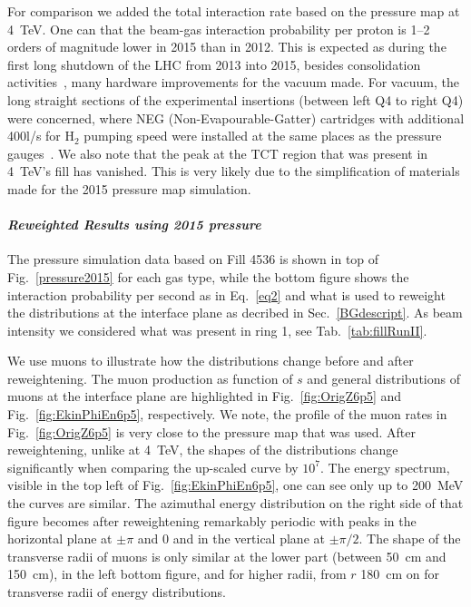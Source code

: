 For comparison we added the total interaction rate based on the pressure map at 4~TeV. One can that the beam-gas interaction probability per proton is 1--2 orders of magnitude lower in 2015 than in 2012. This is expected as during the first long shutdown of the LHC from 2013 into 2015, besides consolidation activities~\cite{KatyForazIpac14}, many hardware improvements for the vacuum made. For vacuum, the long straight sections of the experimental insertions (between left Q4 to right Q4) were concerned, where NEG (Non-Evapourable-Gatter) cartridges with additional 400l/s for H$_2$ pumping speed were installed at the same places as the pressure gauges~\cite{christinaPriv}. We also note that the peak at the TCT region that was present in 4~TeV's fill has vanished. This is very likely due to the simplification of materials made for the 2015 pressure map simulation.


\paragraph{\textit{Reweighted Results using 2015 pressure}}

The pressure simulation data based on Fill 4536 is shown in top of Fig.~\ref{pressure2015} for each gas type, while the bottom figure shows the interaction probability per second as in Eq.~\ref{eq2} and what is used to reweight the distributions at the interface plane as decribed in Sec.~\ref{BGdescript}. As beam intensity we considered what was present in ring 1, see Tab.~\ref{tab:fillRunII}.

We use muons to illustrate how the distributions change before and after reweightening. The muon production as function of $s$ and general distributions of muons at the interface plane are highlighted in Fig.~\ref{fig:OrigZ6p5} and Fig.~\ref{fig:EkinPhiEn6p5}, respectively. We note, the profile of the muon rates in Fig.~\ref{fig:OrigZ6p5} is very close to the pressure map that was used. After reweightening, unlike at 4~TeV, the shapes of the distributions change significantly when comparing the up-scaled curve by $10^7$. The energy spectrum, visible in the top left of Fig.~\ref{fig:EkinPhiEn6p5}, one can see only up to 200~MeV the curves are similar. The azimuthal energy distribution on the right side of that figure becomes after reweightening remarkably periodic with peaks in the horizontal plane at $\pm \pi$ and $0$ and in the vertical plane at $\pm \pi/2$. The shape of the transverse radii of muons is only similar at the lower part (between 50~cm and 150~cm), in the left bottom figure, and for higher radii,  from $r$ 180~cm on for transverse radii of energy distributions.

